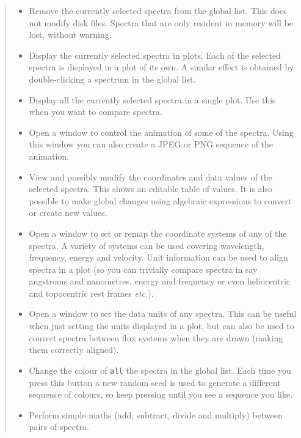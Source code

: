 \documentclass[twoside,11pt]{article}
\newcommand{\htmladdimg}[1]{}
\newcommand{\latexhtml}[2]{#1}
\renewcommand{\_}{\texttt{\symbol{95}}}
\newcommand{\inline}[1]
        {\latexhtml{\texttt{[image: sun243\_figures/\#1.eps]}}
        {\htmladdimg[align=center]{#1.gif}}}
\newcommand{\hitext}[1]{\texttt{#1}}
\newcommand{\etc}{\textit{etc.}}
\begin{document}
\begin{quote}
\begin{itemize}
  \item[\inline{remove}] Remove the currently selected spectra from the
  global list. This does not modify disk files. Spectra that are only
  resident in memory will be lost, without warning.

  \item[\inline{display}] Display the currently selected spectra in
  plots. Each of the selected spectra is displayed in a plot of its
  own. A similar effect is obtained by double-clicking a spectrum in the
  global list.

  \item[\inline{multidisplay}] Display all the currently selected
  spectra in a single plot. Use this when you want to compare spectra.

  \item[\inline{animate}] Open a window to control the animation of some
  of the spectra. Using this window you can also create a JPEG or PNG
  sequence of the animation.

  \item[\inline{table}] View and possibly modify the coordinates and
  data values of the selected spectra. This shows an editable table of
  values. It is also possible to make global changes using
  algebraic expressions to convert or create new values.

  \item[\inline{xunits}] Open a window to set or remap the coordinate
  systems of any of the spectra. A variety of systems can be used
  covering wavelength, frequency, energy and velocity. Unit
  information can be used to align spectra in a plot (so you can
  trivially compare spectra in say angstroms and nanometres,
  energy and frequency or even heliocentric and topocentric rest frames
  \etc).

  \item[\inline{yunits}] Open a window to set the data units of any spectra.
  This can be useful when just setting the units displayed in a plot, but
  can also be used to convert spectra between flux systems when they are
  drawn (making them correctly aligned).

  \item[\inline{rainbow}] Change the colour of \hitext{all} the spectra
  in the global list. Each time you press this button a new random seed
  is used to generate a different sequence of colours, so keep pressing
  until you see a sequence you like.

  \item[\inline{binarymath}] Perform simple maths (add, subtract, divide
  and multiply) between pairs of spectra.


\end{itemize}
\end{quote}
\end{document}
